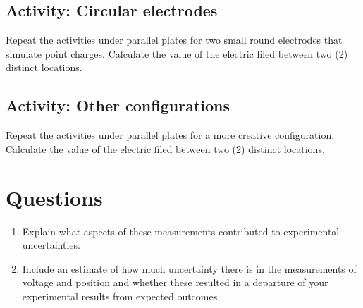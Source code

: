 \begin{multicols}{2}
\subsection{Activity: Circular electrodes}
Repeat the activities under parallel plates for two small round electrodes that simulate point charges. Calculate the value of the electric filed between two (2) distinct locations.

\subsection{Activity: Other configurations}
Repeat the activities under parallel plates for a more creative configuration. Calculate the value of the electric filed between two (2) distinct locations.
\end{multicols}

\section{Questions}
\begin{enumerate}
	 \item Explain what aspects of these measurements contributed to experimental uncertainties.
	 \item Include an estimate of how much uncertainty there is in the measurements of voltage and position and whether these resulted in a departure of your experimental results from expected outcomes.
\end{enumerate}


\endinput
